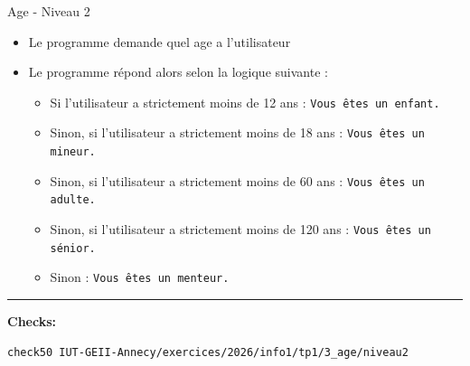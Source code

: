 \begin{UPSTIcahierDesCharges}{Age - Niveau 2}
	\begin{itemize}
		\item[$\Box$] Le programme demande quel age a l'utilisateur
		\item[$\Box$] Le programme répond alors selon la logique suivante :
		      \begin{itemize}
			      \item[$\Box$] Si l'utilisateur a strictement moins de 12 ans : \texttt{Vous êtes un enfant.}
			      \item[$\Box$] Sinon, si l'utilisateur a strictement moins de 18 ans : \texttt{Vous êtes un mineur.}
			      \item[$\Box$] Sinon, si l'utilisateur a strictement moins de 60 ans : \texttt{Vous êtes un adulte.}
			      \item[$\Box$] Sinon, si l'utilisateur a strictement moins de 120 ans : \texttt{Vous êtes un sénior.}
			      \item[$\Box$] Sinon : \texttt{Vous êtes un menteur.}
		      \end{itemize}
	\end{itemize}
	\hrule
	\textbf{Checks:}
	\begin{lstlisting}[language=bash,style=console]
check50 IUT-GEII-Annecy/exercices/2026/info1/tp1/3_age/niveau2
\end{lstlisting}
\end{UPSTIcahierDesCharges}